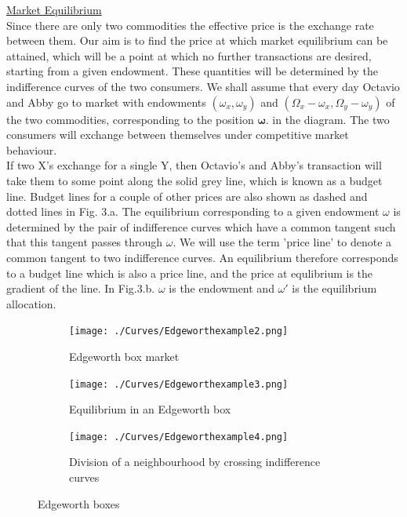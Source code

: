 \documentclass[a4paper, 12pt, reqno]{article}
\begin{document}
\underline{Market Equilibrium} \\
Since there are only two commodities the effective price is the exchange rate between them. Our aim is to find the price at which market equilibrium can be attained, which will be a point at which no further 
transactions are desired, starting from a given endowment. These quantities will be determined by the indifference curves of the two consumers.
We shall assume that every day Octavio and Abby go to market with endowments $(\omega_x, \omega_y )$ and $(\Omega_x - \omega_x , \Omega_y - \omega_y )$ of the two commodities, corresponding to the position $\mathbf{\omega}$. 
in the diagram. The two consumers will exchange between themselves under competitive market behaviour. \\
If two X's exchange for a single Y, then Octavio's and Abby's transaction will take them to some point along the solid grey line, which is known as a budget line.
Budget lines for a couple of other prices are also shown as dashed and dotted lines in Fig. 3.a.
The equilibrium corresponding to a given endowment $\omega$ is determined by the pair of indifference curves which have a common tangent such that this tangent passes through $\omega$. We will use the term 'price line' to denote a common tangent to two indifference curves. 
An equilibrium therefore corresponds to a budget line which is also a price line, and the price at equlibrium is the gradient of the line. 
In Fig.3.b.  $\omega$ is the endowment and $\omega '$ is the equilibrium allocation.
\begin{figure}[H]
    \centering
    \begin{subfigure}{0.4\textwidth}
        \texttt{[image: ./Curves/Edgeworthexample2.png]}
        \caption{Edgeworth box market}
        \label{fig:3a}
    \end{subfigure}
    \hfill
    \begin{subfigure}{0.4\textwidth}
        \texttt{[image: ./Curves/Edgeworthexample3.png]}
        \caption{Equilibrium in an Edgeworth box}
        \label{fig:3b}
    \end{subfigure}
    \hfill
    \begin{subfigure}{0.4\textwidth}
        \texttt{[image: ./Curves/Edgeworthexample4.png]}
        \caption{Division of a neighbourhood by crossing indifference curves}
        \label{fig:3c}
    \end{subfigure}
            
    \caption{Edgeworth boxes}
    \label{fig:two curves}
\end{figure}
\end{document}
